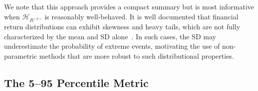 \documentclass[journal]{IEEEtran}
\begin{document}




We note that this approach provides a compact summary but is most informative when $\mathcal{H}_{R^{(h)}}$ is reasonably well-behaved. 
It is well documented that financial return distributions can exhibit skewness and heavy tails, which are not fully characterized by the mean and SD alone~\cite{mandelbrot2004fractals}. 
In such cases, the SD may underestimate the probability of extreme events, motivating the use of non-parametric methods that are more robust to such distributional properties.

\subsection{The 5--95 Percentile Metric}
\end{document}
